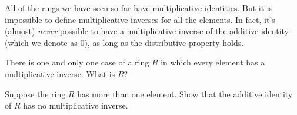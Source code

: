 

All of the rings we have seen so far have multiplicative identities. But it is impossible to define multiplicative inverses for all the elements. In fact, it's (almost) \emph{never} possible to  have a multiplicative inverse of the additive identity (which we denote as 0), as long as the distributive property holds.

\begin{exercise}
There is one and only one case of a ring $R$ in which every element has a multiplicative inverse. What is $R$? 
\end{exercise}

\begin{exercise}
Suppose the ring $R$ has more than one element.  Show that the additive identity of $R$ has no multiplicative inverse.
\end{exercise}



